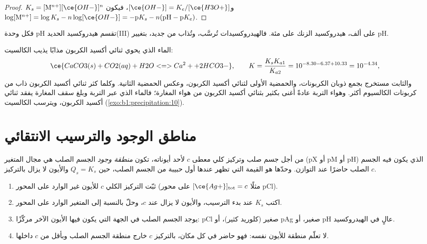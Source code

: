 \begin{proof}
$K_s = [\mathrm{M}^{n+}][\ce{OH-}]^n$ و$[\ce{OH-}] = K_e/[\ce{H3O+}]$،
فيكون $\log[\mathrm{M}^{n+}] = \log K_s - n\log[\ce{OH-}] = -\mathrm{p}K_s -
n(\mathrm{pH} - \mathrm{p}K_e)$.
\end{proof}

فكل وحدة pH تقسم  هيدروكسيد الحديد(III) على
ألف،  هيدروكسيد الزنك على مئة. فالهيدروكسيدات
تُرسَّب، وتُذاب من جديد، بتغيير pH.

\begin{example}\label{ex:b1:precipitation:cave}
الماء الذي يحوي ثنائي أكسيد الكربون مذابًا يذيب الكالسيت:
\[
  \ce{CaCO3(s) + CO2(aq) + H2O <=> Ca^2+ + 2HCO3-}, \qquad
  K = \frac{K_s K_{a1}}{K_{a2}} = 10^{-8.30 - 6.37 + 10.33} = 10^{-4.34} ,
\]
والثابت مستخرج بجمع ذوبان الكربونات،
والحمضية الأولى لثنائي أكسيد الكربون، وعكس الحمضية الثانية. وكلما
كثر ثنائي أكسيد الكربون ذاب من كربونات الكالسيوم أكثر. وهواء التربة عادةً
أغنى بكثير بثنائي أكسيد الكربون من هواء المغارة؛ فالماء الذي
عبر التربة وبلغ سقف المغارة يفقد ثنائي أكسيد الكربون،
ويترسب الكالسيت (\cref{exo:b1:precipitation:10}).
\end{example}

\section{مناطق الوجود والترسيب الانتقائي}\label{sec:b1:precipitation:domains}

\begin{definition}\label{def:b1:precipitation:existence-domain}
من أجل جسم صلب وتركيز كلي معطى $c$ لأحد أيوناته، تكون
\emph{منطقة وجود} الجسم الصلب هي مجال
المتغير (pX أو pM أو pH) الذي يكون فيه الجسم الصلب حاضرًا عند
التوازن. وحدّها هو القيمة التي تظهر عندها أول حبيبة من الجسم
الصلب، حين $Q_s = K_s$ والأيون لا يزال بالتركيز $c$.
\end{definition}

\begin{method}\label{met:b1:precipitation:existence-domain}
\begin{enumerate}
  \item ثبّت التركيز الكلي $c$ للأيون غير الوارد على
        المحور (مثلًا $[\ce{Ag+}]_{\mathrm{tot}} = c$ على محور pCl).
  \item اكتب $K_s$ عند بدء الترسيب، والأيون لا يزال عند
        $c$، وحلّ بالنسبة إلى المتغير الوارد على المحور.
  \item يوجد الجسم الصلب في الجهة التي يكون فيها الأيون الآخر
        مركّزًا: pCl صغير (كلوريد كثير)، أو pAg صغير، أو pH عالٍ
        في الهيدروكسيد.
  \item لا تعلّم منطقة للأيون نفسه: فهو حاضر
        في كل مكان، بالتركيز $c$ خارج منطقة الجسم الصلب وبأقل من $c$
        داخلها.
\end{enumerate}
\end{method}

